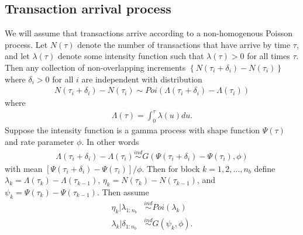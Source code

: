 \documentclass{article}
\begin{document}
\subsection{Transaction arrival process}
We will assume that transactions arrive according to a non-homogenous Poisson process. Let $N(\tau)$ denote the number of transactions that have arrive by time $\tau$, and let $\lambda(\tau)$ denote some intensity function such that $\lambda(\tau) > 0$ for all times $\tau$. Then any collection of non-overlapping increments $\left\{N(\tau_i + \delta_i) - N(\tau_i)\right\}$ where $\delta_i>0$ for all $i$ are independent with distribution
\begin{align*}
N(\tau_i + \delta_i) - N(\tau_i) \sim Poi(\Lambda(\tau_i + \delta_i) - \Lambda(\tau_i))
\end{align*}
where 
\begin{align*}
\Lambda(\tau) = \int_0^\tau \lambda(u)du.
\end{align*}
Suppose the intensity function is a gamma process with shape function $\Psi(\tau)$ and rate parameter $\phi$. In other words
\begin{align*}
\Lambda(\tau_i + \delta_i) - \Lambda(\tau_i) \stackrel{ind}{\sim} G(\Psi(\tau_i + \delta_i) - \Psi(\tau_i), \phi)
\end{align*}
with mean $[\Psi(\tau_i + \delta_i) - \Psi(\tau_i)]/\phi$. Then for block $k=1,2,\dots,n_{b}$ define $\lambda_k = \Lambda(\tau_k) - \Lambda(\tau_{k-1})$, $\eta_k = N(\tau_k) - N(\tau_{k-1})$, and $\psi_k = \Psi(\tau_k) - \Psi(\tau_{k-1})$. Then assume
\begin{align*}
\eta_k | \lambda_{1:n_{b}} &\stackrel{ind}{\sim} Poi(\lambda_k)\\
\lambda_k|\delta_{1:n_{b}} &\stackrel{ind}{\sim} G(\psi_k, \phi).
\end{align*}
\end{document}
